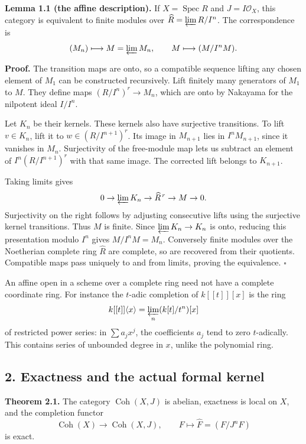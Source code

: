 \documentclass[11pt]{article}
\begin{document}
\textbf{Lemma 1.1 (the affine description).} If
\(X=\operatorname{Spec}R\) and \(J=I\mathcal O_X\), this category is
equivalent to finite modules over \(\widehat R=\varprojlim R/I^n\). The
correspondence is \[
(M_n)\longmapsto M=\varprojlim M_n,
\qquad M\longmapsto(M/I^nM).
\]

\textbf{Proof.} The transition maps are onto, so a compatible sequence
lifting any chosen element of \(M_1\) can be constructed recursively.
Lift finitely many generators of \(M_1\) to \(M\). They define maps
\((R/I^n)^r\to M_n\), which are onto by Nakayama for the nilpotent ideal
\(I/I^n\).

Let \(K_n\) be their kernels. These kernels also have surjective
transitions. To lift \(v\in K_n\), lift it to \(w\in(R/I^{n+1})^r\). Its
image in \(M_{n+1}\) lies in \(I^nM_{n+1}\), since it vanishes in
\(M_n\). Surjectivity of the free-module map lets us subtract an element
of \(I^n(R/I^{n+1})^r\) with that same image. The corrected lift belongs
to \(K_{n+1}\).

Taking limits gives \[
0\to\varprojlim K_n\to\widehat R^{\,r}\to M\to0.
\] Surjectivity on the right follows by adjusting consecutive lifts
using the surjective kernel transitions. Thus \(M\) is finite. Since
\(\varprojlim K_n\to K_n\) is onto, reducing this presentation modulo
\(I^n\) gives \(M/I^nM=M_n\). Conversely finite modules over the
Noetherian complete ring \(\widehat R\) are complete, so are recovered
from their quotients. Compatible maps pass uniquely to and from limits,
proving the equivalence. \(\square\)

An affine open in a scheme over a complete ring need not have a complete
coordinate ring. For instance the \(t\)-adic completion of \(k[[t]][x]\)
is the ring \[
k[[t]]\langle x\rangle=\varprojlim_n(k[t]/t^n)[x]
\] of restricted power series: in \(\sum a_jx^j\), the coefficients
\(a_j\) tend to zero \(t\)-adically. This contains series of unbounded
degree in \(x\), unlike the polynomial ring.

\subsection{2. Exactness and the actual formal
kernel}\label{exactness-and-the-actual-formal-kernel}

\textbf{Theorem 2.1.} The category \(\operatorname{Coh}(X,J)\) is
abelian, exactness is local on \(X\), and the completion functor \[
\operatorname{Coh}(X)\longrightarrow\operatorname{Coh}(X,J),
\qquad F\longmapsto\widehat F=(F/J^nF)
\] is exact.
\end{document}
